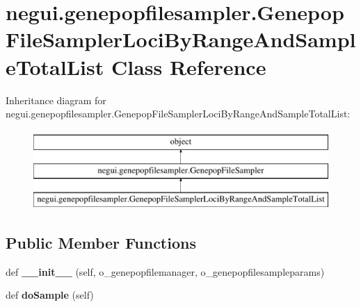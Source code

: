 \hypertarget{classnegui_1_1genepopfilesampler_1_1GenepopFileSamplerLociByRangeAndSampleTotalList}{}\section{negui.\+genepopfilesampler.\+Genepop\+File\+Sampler\+Loci\+By\+Range\+And\+Sample\+Total\+List Class Reference}
\label{classnegui_1_1genepopfilesampler_1_1GenepopFileSamplerLociByRangeAndSampleTotalList}
Inheritance diagram for negui.\+genepopfilesampler.\+Genepop\+File\+Sampler\+Loci\+By\+Range\+And\+Sample\+Total\+List\+:\begin{figure}[H]
\begin{center}
\leavevmode
\includegraphics[height=3.000000cm]{classnegui_1_1genepopfilesampler_1_1GenepopFileSamplerLociByRangeAndSampleTotalList}
\end{center}
\end{figure}
\subsection*{Public Member Functions}
\begin{DoxyCompactItemize}
\item 
def {\bfseries \+\_\+\+\_\+init\+\_\+\+\_\+} (self, o\+\_\+genepopfilemanager, o\+\_\+genepopfilesampleparams)\hypertarget{classnegui_1_1genepopfilesampler_1_1GenepopFileSamplerLociByRangeAndSampleTotalList_a67bb332cbf92b3f3f07f15905b2e40d5}{}\label{classnegui_1_1genepopfilesampler_1_1GenepopFileSamplerLociByRangeAndSampleTotalList_a67bb332cbf92b3f3f07f15905b2e40d5}

\item 
def {\bfseries do\+Sample} (self)\hypertarget{classnegui_1_1genepopfilesampler_1_1GenepopFileSamplerLociByRangeAndSampleTotalList_a4760540c2cbe3536e2f85772b1fd8dad}{}\label{classnegui_1_1genepopfilesampler_1_1GenepopFileSamplerLociByRangeAndSampleTotalList_a4760540c2cbe3536e2f85772b1fd8dad}

\end{DoxyCompactItemize}


